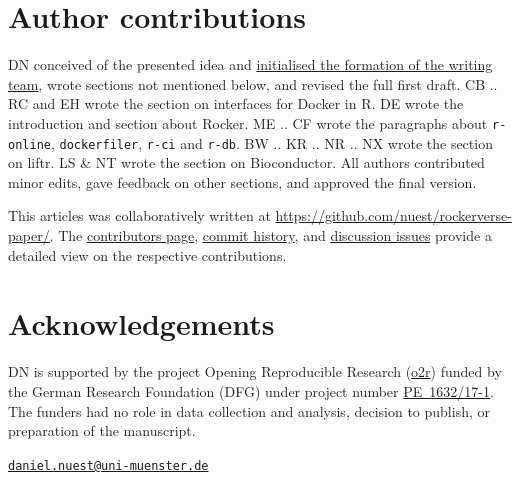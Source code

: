 \hypertarget{author-contributions}{%
\section{Author contributions}\label{author-contributions}}

DN conceived of the presented idea and
\href{https://github.com/nuest/rockerverse-paper/issues/3}{initialised the formation of the writing team},
wrote sections not mentioned below, and revised the full first draft. CB
.. RC and EH wrote the section on interfaces for Docker in R. DE wrote
the introduction and section about Rocker. ME .. CF wrote the paragraphs
about \texttt{r-online}, \texttt{dockerfiler}, \texttt{r-ci} and
\texttt{r-db}. BW .. KR .. NR .. NX wrote the section on liftr. LS \& NT
wrote the section on Bioconductor. All authors contributed minor edits,
gave feedback on other sections, and approved the final version.

This articles was collaboratively written at
\href{https://github.com/nuest/rockerverse-paper/}{https://github.com/nuest/rockerverse-paper/}.
The
\href{https://github.com/nuest/rockerverse-paper/graphs/contributors}{contributors page},
\href{https://github.com/nuest/rockerverse-paper/commits/master}{commit history},
and
\href{https://github.com/nuest/rockerverse-paper/issues/}{discussion issues}
provide a detailed view on the respective contributions.

\hypertarget{acknowledgements}{%
\section{Acknowledgements}\label{acknowledgements}}

DN is supported by the project Opening Reproducible Research
(\href{https://www.uni-muenster.de/forschungaz/project/12343}{o2r})
funded by the German Research Foundation (DFG) under project number
\href{https://gepris.dfg.de/gepris/projekt/415851837}{PE~1632/17-1}. The
funders had no role in data collection and analysis, decision to
publish, or preparation of the manuscript.




\address{%
Daniel Nüst\\
University of Münster\\
Institute for Geoinformatics\\ Heisenbergstr. 2\\ 48149 Münster, Germany\\ \\
}
\href{mailto:daniel.nuest@uni-muenster.de}{\nolinkurl{daniel.nuest@uni-muenster.de}}

